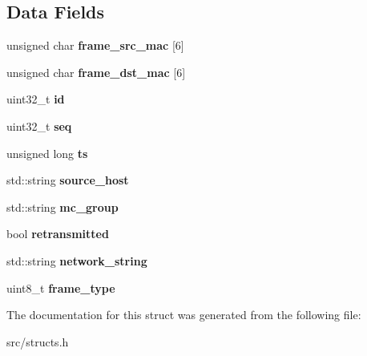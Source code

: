 \subsection*{Data Fields}
\begin{DoxyCompactItemize}
\item 
\hypertarget{structack__cr__info_ae1adc5a36bc0b0cec0d13e44a2378519}{unsigned char {\bfseries frame\-\_\-src\-\_\-mac} \mbox{[}6\mbox{]}}\label{structack__cr__info_ae1adc5a36bc0b0cec0d13e44a2378519}

\item 
\hypertarget{structack__cr__info_ab1dc8d3ff8da2011155ebc36f155cfec}{unsigned char {\bfseries frame\-\_\-dst\-\_\-mac} \mbox{[}6\mbox{]}}\label{structack__cr__info_ab1dc8d3ff8da2011155ebc36f155cfec}

\item 
\hypertarget{structack__cr__info_ac377b17e56bdbec3ebe5069aa94e2508}{uint32\-\_\-t {\bfseries id}}\label{structack__cr__info_ac377b17e56bdbec3ebe5069aa94e2508}

\item 
\hypertarget{structack__cr__info_ace8975310c3aa06cb660e1f9eeec5a94}{uint32\-\_\-t {\bfseries seq}}\label{structack__cr__info_ace8975310c3aa06cb660e1f9eeec5a94}

\item 
\hypertarget{structack__cr__info_ae305fb09165abd104507c90b74d51b94}{unsigned long {\bfseries ts}}\label{structack__cr__info_ae305fb09165abd104507c90b74d51b94}

\item 
\hypertarget{structack__cr__info_a9775625a36d38934b63cc4312b089c58}{std\-::string {\bfseries source\-\_\-host}}\label{structack__cr__info_a9775625a36d38934b63cc4312b089c58}

\item 
\hypertarget{structack__cr__info_ab585640607fc3311d981fa9c8c0e1e5b}{std\-::string {\bfseries mc\-\_\-group}}\label{structack__cr__info_ab585640607fc3311d981fa9c8c0e1e5b}

\item 
\hypertarget{structack__cr__info_a2c8e0d4be3c0fe42212b21de47e0cbb3}{bool {\bfseries retransmitted}}\label{structack__cr__info_a2c8e0d4be3c0fe42212b21de47e0cbb3}

\item 
\hypertarget{structack__cr__info_a7a664545d7cb43b60528cdd98d920e16}{std\-::string {\bfseries network\-\_\-string}}\label{structack__cr__info_a7a664545d7cb43b60528cdd98d920e16}

\item 
\hypertarget{structack__cr__info_a8369e5f06e6f45c06d74ffc584e025e7}{uint8\-\_\-t {\bfseries frame\-\_\-type}}\label{structack__cr__info_a8369e5f06e6f45c06d74ffc584e025e7}

\end{DoxyCompactItemize}


The documentation for this struct was generated from the following file\-:\begin{DoxyCompactItemize}
\item 
src/structs.\-h\end{DoxyCompactItemize}
